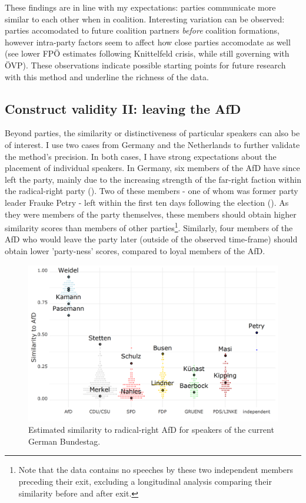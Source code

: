 \documentclass{article}
\begin{document}
These findings are in line with my expectations: parties communicate more similar to each other when in coalition. Interesting variation can be observed: parties accomodated to future coalition partners \textit{before} coalition formations, however intra-party factors seem to affect how close parties accomodate as well (see lower FPÖ estimates following Knittelfeld crisis, while still governing with ÖVP). These observations indicate possible starting points for future research with this method and underline the richness of the data.\par



\subsection{Construct validity II: leaving the AfD}

Beyond parties, the similarity or distinctiveness of particular speakers can also be of interest. I use two cases from Germany and the Netherlands to further validate the method's precision. In both cases, I have strong expectations about the placement of individual speakers. In Germany, six members of the AfD have since left the party, mainly due to the increasing strength of the far-right faction within the radical-right party (\cite{Steffen2020AfD}). Two of these members - one of whom was former party leader Frauke Petry - left within the first ten days following the election (\cite{LSE2018AfD}). As they were members of the party themselves, these members should obtain higher similarity scores than members of other parties\footnote{Note that the data contains no speeches by these two independent members preceding their exit, excluding a longitudinal analysis comparing their similarity before and after exit.}. Similarly, four members of the AfD who would leave the party later (outside of the observed time-frame) should obtain lower 'party-ness' scores, compared to loyal members of the AfD. \par

\begin{figure}
    \centering
    \includegraphics[width=\textwidth]{DE/vis/DE_speakers_PA.png}
    \caption{Estimated similarity to radical-right AfD for speakers of the current German Bundestag.}
    \label{fig:speakers}
\end{figure}
\end{document}
